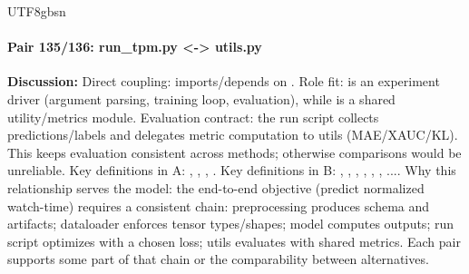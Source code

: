 \documentclass[11pt]{article}
\begin{document}
\begin{CJK*}{UTF8}{gbsn}
\paragraph{Pair 135/136: run\_tpm.py <-> utils.py}
\textbf{Discussion:} Direct coupling: \texttt{} imports/depends on \texttt{}. Role fit: \texttt{} is an experiment driver (argument parsing, training loop, evaluation), while \texttt{} is a shared utility/metrics module. Evaluation contract: the run script collects predictions/labels and delegates metric computation to utils (MAE/XAUC/KL). This keeps evaluation consistent across methods; otherwise comparisons would be unreliable. Key definitions in A: \texttt{}, \texttt{}, \texttt{}, \texttt{}. Key definitions in B: \texttt{}, \texttt{}, \texttt{}, \texttt{}, \texttt{}, \texttt{}, .... Why this relationship serves the model: the end-to-end objective (predict normalized watch-time) requires a consistent chain: preprocessing produces schema and artifacts; dataloader enforces tensor types/shapes; model computes outputs; run script optimizes with a chosen loss; utils evaluates with shared metrics. Each pair supports some part of that chain or the comparability between alternatives.


\end{CJK*}
\end{document}

